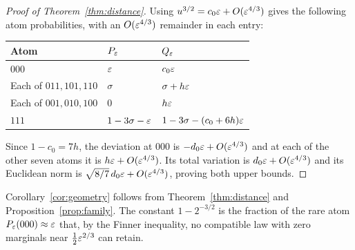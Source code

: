 \begin{proof}[Proof of Theorem~\ref{thm:distance}]
Using $u^{3/2}=c_0\varepsilon+O(\varepsilon^{4/3})$ gives the following atom probabilities, with an $O(\varepsilon^{4/3})$ remainder in each entry:
\begin{center}
\begin{tabular}{@{}lll@{}}
\toprule
Atom & $P_\varepsilon$ & $Q_\varepsilon$ \\
\midrule
$000$ & $\varepsilon$ & $c_0\varepsilon$ \\
Each of $011,101,110$ & $\sigma$ & $\sigma+h\varepsilon$ \\
Each of $001,010,100$ & $0$ & $h\varepsilon$ \\
$111$ & $1-3\sigma-\varepsilon$ & $1-3\sigma-(c_0+6h)\varepsilon$ \\
\bottomrule
\end{tabular}
\end{center}
Since $1-c_0=7h$, the deviation at $000$ is $-d_0\varepsilon+O(\varepsilon^{4/3})$ and at each of the other seven atoms it is $h\varepsilon+O(\varepsilon^{4/3})$. Its total variation is $d_0\varepsilon+O(\varepsilon^{4/3})$ and its Euclidean norm is $\sqrt{8/7}\,d_0\varepsilon+O(\varepsilon^{4/3})$, proving both upper bounds.
\end{proof}

Corollary~\ref{cor:geometry} follows from Theorem~\ref{thm:distance} and Proposition~\ref{prop:family}. The constant $1-2^{-3/2}$ is the fraction of the rare atom $P_\varepsilon(000)\approx\varepsilon$ that, by the Finner inequality, no compatible law with zero marginals near $\tfrac12\varepsilon^{2/3}$ can retain.
